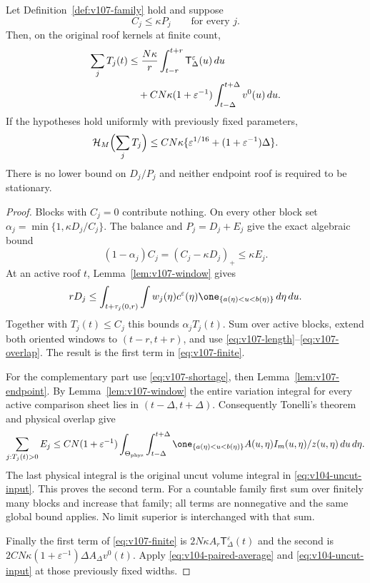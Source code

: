 \begin{theorem}
\label{thm:v107-envelope}
Let Definition~\ref{def:v107-family} hold and suppose
\begin{equation}\label{eq:v107-balance}
 C_j\le\kappa P_j\qquad\text{for every }j.
\end{equation}
Then, on the original roof kernels at finite count,
\begin{align}
 \sum_j T_j(t)
 &\le {N\kappa\over r}\int_{t-r}^{t+r}
                  \mathsf T_\Delta^\varepsilon(u)\,du\notag\\
 &\quad+C N\kappa(1+\varepsilon^{-1})
                      \int_{t-\Delta}^{t+\Delta}v^0(u)\,du.
                                      \label{eq:v107-finite}
\end{align}
If the hypotheses hold uniformly with previously fixed parameters,
\begin{equation}\label{eq:v107-height}
 \mathcal H_M\Bigl(\sum_jT_j\Bigr)
 \le C N\kappa\{\varepsilon^{1/16}
                         +(1+\varepsilon^{-1})\Delta\}.
\end{equation}
There is no lower bound on $D_j/P_j$ and neither endpoint roof
is required to be stationary.
\end{theorem}
\begin{proof}
Blocks with $C_j=0$ contribute nothing. On every other block set
$\alpha_j=\min\{1,\kappa D_j/C_j\}$. The balance and $P_j=D_j+E_j$
give the exact algebraic bound
\begin{equation}\label{eq:v107-shortage}
 (1-\alpha_j)C_j=(C_j-\kappa D_j)_+\le\kappa E_j.
\end{equation}
At an active roof $t$, Lemma~\ref{lem:v107-window} gives
\[
 rD_j\le\int_{t+\tau_j(0,r)}
           \int w_j(\eta)c^\varepsilon(\eta)
              \one_{\{a(\eta)<u<b(\eta)\}}\,d\eta\,du.
\]
Together with $T_j(t)\le C_j$ this bounds $\alpha_jT_j(t)$.
Sum over active blocks, extend both oriented windows to $(t-r,t+r)$,
and use \eqref{eq:v107-length}--\eqref{eq:v107-overlap}.
The result is the first term in \eqref{eq:v107-finite}.

For the complementary part use \eqref{eq:v107-shortage}, then
Lemma~\ref{lem:v107-endpoint}. By Lemma~\ref{lem:v107-window}
the entire variation integral for every active comparison sheet lies
in $(t-\Delta,t+\Delta)$. Consequently Tonelli's theorem and
physical overlap give
\[
 \sum_{j:T_j(t)>0}E_j
 \le C N(1+\varepsilon^{-1})
   \int_{\Theta_{\rm phys}}\int_{t-\Delta}^{t+\Delta}
       \one_{\{a(\eta)<u<b(\eta)\}}
                A(u,\eta)I_m(u,\eta)/z(u,\eta)\,du\,d\eta.
\]
The last physical integral is the original uncut volume integral
in \eqref{eq:v104-uncut-input}. This proves the second term.
For a countable family first sum over finitely many blocks and
increase that family; all terms are nonnegative and the same global
bound applies. No limit superior is interchanged with that sum.

Finally the first term of \eqref{eq:v107-finite} is
$2N\kappa A_r\mathsf T_\Delta^\varepsilon(t)$ and the second is
$2C N\kappa(1+\varepsilon^{-1})\Delta A_\Delta v^0(t)$.
Apply \eqref{eq:v104-paired-average} and
\eqref{eq:v104-uncut-input} at those previously fixed widths.
\end{proof}

